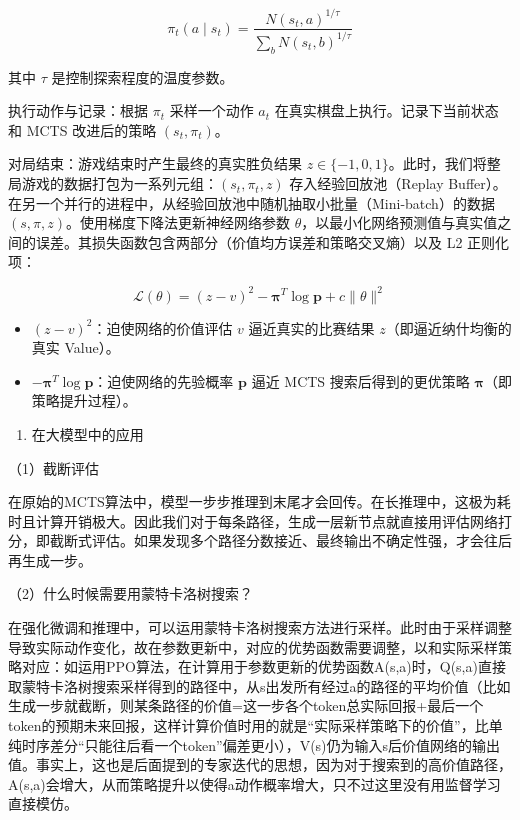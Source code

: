 \[
\pi_t(a\mid s_t)=\frac{N(s_t,a)^{1/\tau}}{\sum_b N(s_t,b)^{1/\tau}}
\]

其中 \(\tau\) 是控制探索程度的温度参数。

执行动作与记录：根据 \(\pi_t\) 采样一个动作 \(a_t\) 在真实棋盘上执行。记录下当前状态和 MCTS 改进后的策略 \((s_t,\pi_t)\)。

对局结束：游戏结束时产生最终的真实胜负结果 \(z\in\{-1,0,1\}\)。此时，我们将整局游戏的数据打包为一系列元组：\((s_t,\pi_t,z)\) 存入经验回放池（Replay Buffer）。在另一个并行的进程中，从经验回放池中随机抽取小批量（Mini-batch）的数据 \((s,\pi,z)\)。使用梯度下降法更新神经网络参数 \(\theta\)，以最小化网络预测值与真实值之间的误差。其损失函数包含两部分（价值均方误差和策略交叉熵）以及 L2 正则化项：

\[
\mathcal{L}(\theta)=(z-v)^2-\boldsymbol{\pi}^{T}\log\mathbf{p}+c\lVert\theta\rVert^2
\]

\begin{itemize}
\tightlist
\item
  \((z-v)^2\)：迫使网络的价值评估 \(v\) 逼近真实的比赛结果 \(z\)（即逼近纳什均衡的真实 Value）。
\item
  \(-\boldsymbol{\pi}^{T}\log\mathbf{p}\)：迫使网络的先验概率 \(\mathbf{p}\) 逼近 MCTS 搜索后得到的更优策略 \(\boldsymbol{\pi}\)（即策略提升过程）。
\end{itemize}

\begin{enumerate}
\def\labelenumi{\arabic{enumi}.}
\setcounter{enumi}{2}
\tightlist
\item
  在大模型中的应用
\end{enumerate}

（1）截断评估

在原始的MCTS算法中，模型一步步推理到末尾才会回传。在长推理中，这极为耗时且计算开销极大。因此我们对于每条路径，生成一层新节点就直接用评估网络打分，即截断式评估。如果发现多个路径分数接近、最终输出不确定性强，才会往后再生成一步。

（2）什么时候需要用蒙特卡洛树搜索？

在强化微调和推理中，可以运用蒙特卡洛树搜索方法进行采样。此时由于采样调整导致实际动作变化，故在参数更新中，对应的优势函数需要调整，以和实际采样策略对应：如运用PPO算法，在计算用于参数更新的优势函数A(s,a)时，Q(s,a)直接取蒙特卡洛树搜索采样得到的路径中，从s出发所有经过a的路径的平均价值（比如生成一步就截断，则某条路径的价值=这一步各个token总实际回报+最后一个token的预期未来回报，这样计算价值时用的就是``实际采样策略下的价值''，比单纯时序差分``只能往后看一个token''偏差更小），V(s)仍为输入s后价值网络的输出值。事实上，这也是后面提到的专家迭代的思想，因为对于搜索到的高价值路径，A(s,a)会增大，从而策略提升以使得a动作概率增大，只不过这里没有用监督学习直接模仿。

